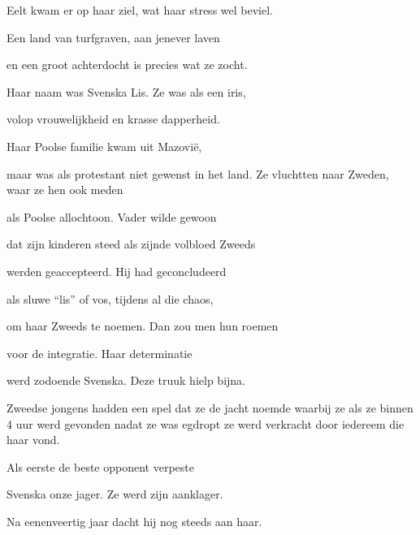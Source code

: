 Eelt kwam er op haar ziel,
wat haar stress wel beviel.

Een land van turfgraven,
aan jenever laven

en een groot achterdocht
is precies wat ze zocht.

Haar naam was Svenska Lis.
Ze was als een iris,

volop vrouwelijkheid
en krasse dapperheid.

Haar Poolse familie
kwam uit Mazovië,

maar was als protestant
niet gewenst in het land.
Ze vluchtten naar Zweden,
waar ze hen ook meden

als Poolse allochtoon.
Vader wilde gewoon

dat zijn kinderen steed
als zijnde volbloed Zweeds

werden geaccepteerd.
Hij had geconcludeerd

als sluwe “lis” of vos,
tijdens al die chaos,

om haar Zweeds te noemen.
Dan zou men hun roemen

voor de integratie.
Haar determinatie

werd zodoende Svenska.
Deze truuk hielp bijna.

Zweedse jongens hadden een spel dat ze de jacht noemde waarbij ze als ze binnen 4 uur werd gevonden nadat ze was egdropt ze werd verkracht door iedereem die haar vond.

Als eerste de beste
opponent verpeste

Svenska onze jager.
Ze werd zijn aanklager.

Na eenenveertig jaar
dacht hij nog steeds aan haar.
